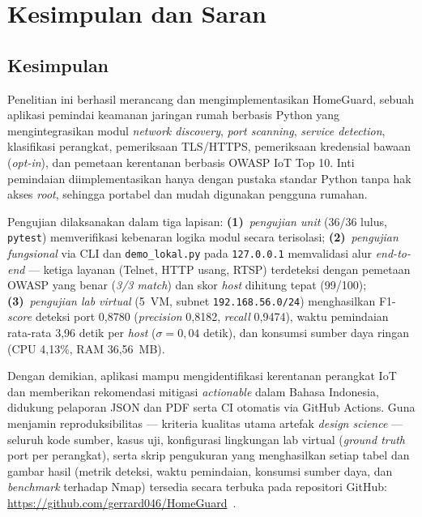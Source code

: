 \documentclass[conference]{IEEEtran}
\begin{document}
\section{Kesimpulan dan Saran}

\subsection{Kesimpulan}

Penelitian ini berhasil merancang dan mengimplementasikan HomeGuard,
sebuah aplikasi pemindai keamanan jaringan rumah berbasis Python yang
mengintegrasikan modul \textit{network discovery}, \textit{port scanning},
\textit{service detection}, klasifikasi perangkat, pemeriksaan TLS/HTTPS,
pemeriksaan kredensial bawaan (\textit{opt-in}), dan pemetaan kerentanan
berbasis OWASP IoT Top 10. Inti pemindaian diimplementasikan hanya
dengan pustaka standar Python tanpa hak akses \textit{root}, sehingga
portabel dan mudah digunakan pengguna rumahan.

Pengujian dilaksanakan dalam tiga lapisan:
\textbf{(1)}~\textit{pengujian unit} (36/36 lulus, \texttt{pytest})
memverifikasi kebenaran logika modul secara terisolasi;
\textbf{(2)}~\textit{pengujian fungsional} via CLI dan
\texttt{demo\_lokal.py} pada \texttt{127.0.0.1} memvalidasi alur
\textit{end-to-end} --- ketiga layanan (Telnet, HTTP usang, RTSP)
terdeteksi dengan pemetaan OWASP yang benar (\textit{3/3 match}) dan
skor \textit{host} dihitung tepat (99/100);
\textbf{(3)}~\textit{pengujian lab virtual} (5~VM, subnet
\texttt{192.168.56.0/24}) menghasilkan F1-\textit{score} deteksi port
0,8780 (\textit{precision} 0,8182, \textit{recall} 0,9474), waktu
pemindaian rata-rata 3,96 detik per \textit{host} ($\sigma = 0{,}04$
detik), dan konsumsi sumber daya ringan (CPU 4,13\%, RAM 36,56~MB).

Dengan demikian, aplikasi mampu mengidentifikasi kerentanan perangkat IoT
dan memberikan rekomendasi mitigasi \textit{actionable} dalam Bahasa
Indonesia, didukung pelaporan JSON dan PDF serta CI otomatis via GitHub
Actions. Guna menjamin reproduksibilitas --- kriteria kualitas utama
artefak \textit{design science} --- seluruh kode sumber, kasus uji,
konfigurasi lingkungan lab virtual (\textit{ground truth} port per
perangkat), serta skrip pengukuran yang menghasilkan setiap tabel dan
gambar hasil (metrik deteksi, waktu pemindaian, konsumsi sumber daya, dan
\textit{benchmark} terhadap Nmap) tersedia secara terbuka pada repositori
GitHub: \url{https://github.com/gerrard046/HomeGuard}~\cite{homeguard2026}.
\end{document}
